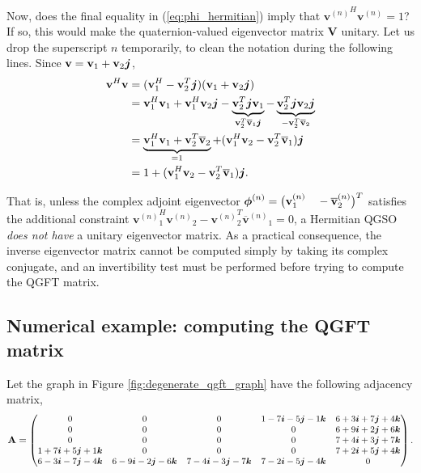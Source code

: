 Now, does the final equality in (\ref{eq:phi_hermitian}) imply that ${\mathbf{v}^{(n)}}^H \mathbf{v}^{(n)} = 1$? If so, this would make the quaternion-valued eigenvector matrix $\mathbf{V}$ unitary. Let us drop the superscript $n$ temporarily, to clean the notation during the following lines. Since $\mathbf{v} = \mathbf{v}_1 + \mathbf{v}_2 \boldsymbol{j}$,
\begin{equation}
\begin{aligned}
\mathbf{v}^H \mathbf{v} &= (\mathbf{v}^H_1 - \mathbf{v}^T_2 \boldsymbol{j}) (\mathbf{v}_1 + \mathbf{v}_2 \boldsymbol{j}) \\
&= \mathbf{v}^H_1 \mathbf{v}_1 + \mathbf{v}^H_1 \mathbf{v}_2 \boldsymbol{j}
- \underbrace{\mathbf{v}^T_2 \boldsymbol{j} \mathbf{v}_1}_{\mathbf{v}^T_2 \overline{\mathbf{v}}_1 \boldsymbol{j}} - \underbrace{\mathbf{v}_2^T \boldsymbol{j} \mathbf{v}_2 \boldsymbol{j}}_{- \mathbf{v}_2^T \overline{\mathbf{v}}_2} \\
&= \underbrace{\mathbf{v}_1^H \mathbf{v}_1 + \mathbf{v}_2^T \overline{\mathbf{v}}_2}_{= 1} +
(\mathbf{v}^H_1 \mathbf{v}_2 - \mathbf{v}_2^T \overline{\mathbf{v}}_1) \boldsymbol{j} \\
&= 1 + (\mathbf{v}^H_1 \mathbf{v}_2 - \mathbf{v}_2^T \overline{\mathbf{v}}_1) \boldsymbol{j}.
\end{aligned}
\end{equation}

That is, unless the complex adjoint eigenvector $\mathbf{\boldsymbol{\phi}}^{(n)} = \big( \mathbf{v}^{(n)}_1 \quad - \overline{\mathbf{v}}^{(n)}_2 \big)^T$ satisfies the additional constraint ${\mathbf{v}^{(n)}}^H_1 {\mathbf{v}^{(n)}}_2 - {\mathbf{v}^{(n)}}_2^T {\overline{\mathbf{v}}^{(n)}}_1 = 0$, a Hermitian QGSO \textit{does not have} a unitary eigenvector matrix. As a practical consequence, the inverse eigenvector matrix cannot be computed simply by taking its complex conjugate, and an invertibility test must be performed before trying to compute the QGFT matrix.


\subsection{Numerical example: computing the QGFT matrix}

Let the graph in Figure \ref{fig:degenerate_qgft_graph} have the following adjacency matrix,
\begin{equation}
\small
\mathbf{A} = \begin{pmatrix}
0 & 0 & 0 & 1 -7\boldsymbol{i} -5\boldsymbol{j} -1\boldsymbol{k} & 6 +3\boldsymbol{i} +7\boldsymbol{j} +4\boldsymbol{k} \\
0 & 0 & 0 & 0 & 6 +9\boldsymbol{i} +2\boldsymbol{j} +6\boldsymbol{k} \\
0 & 0 & 0 & 0 & 7 +4\boldsymbol{i} +3\boldsymbol{j} +7\boldsymbol{k} \\
1 +7\boldsymbol{i} +5\boldsymbol{j} +1\boldsymbol{k} & 0 & 0 & 0 & 7 +2\boldsymbol{i} +5\boldsymbol{j} +4\boldsymbol{k} \\
6 -3\boldsymbol{i} -7\boldsymbol{j} -4\boldsymbol{k} & 6 -9\boldsymbol{i} -2\boldsymbol{j} -6\boldsymbol{k} & 7 -4\boldsymbol{i} -3\boldsymbol{j} -7\boldsymbol{k} & 7 -2\boldsymbol{i} -5\boldsymbol{j} -4\boldsymbol{k} & 0 \\
\end{pmatrix}.
\end{equation}


